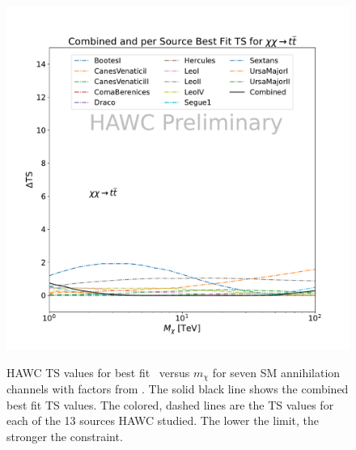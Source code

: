 \begin{figure}[h]
{        \includegraphics[scale=0.21]{figures/glory_duck/hawc/CombinedTS_data_tt_.pdf}
    }
    \caption{HAWC TS values for best fit \sv~versus $m_\chi$ for seven SM annihilation channels with \J factors from \GS. The solid black line shows the combined best fit TS values. The colored, dashed lines are the TS values for each of the 13 sources HAWC studied. The lower the limit, the stronger the constraint.}\label{fig:gd_HAWC_TS}
\end{figure}

